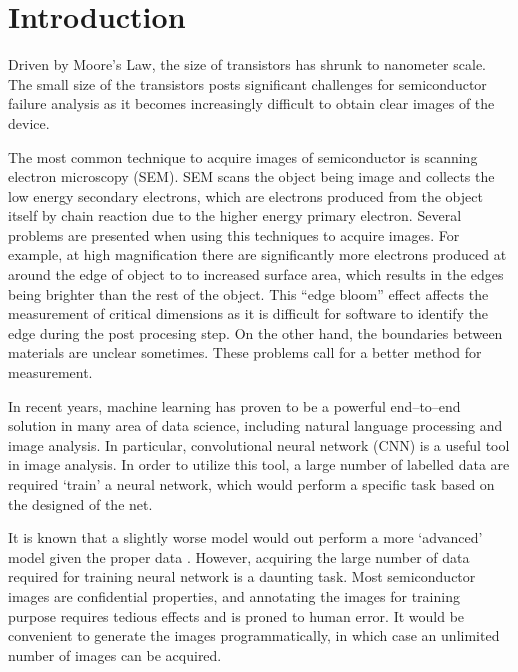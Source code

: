 \chapter{Introduction}
\pagestyle{fancy}
\fancyhead{}
\fancyhead[R]{\thepage}
\fancyfoot{}
\renewcommand{\headrulewidth}{0pt}
\renewcommand{\footrulewidth}{0pt}

\setcounter{page}{1}
Driven by Moore's Law, the size of transistors has shrunk to nanometer scale. The small size of the transistors posts significant challenges for semiconductor failure analysis as it becomes increasingly difficult to obtain clear images of the device.

The most common technique to acquire images of semiconductor is scanning electron microscopy (SEM). SEM scans the object being image and collects the low energy secondary electrons, which are electrons produced from the object itself by chain reaction due to the higher energy primary electron. Several problems are presented when using this techniques to acquire images. For example, at high magnification there are significantly more electrons produced at around the edge of object to to increased surface area, which results in the edges being brighter than the rest of the object. This ``edge bloom'' effect affects the measurement of critical dimensions as it is difficult for software to identify the edge during the post procesing step. On the other hand, the boundaries between materials are unclear sometimes. These problems call for a better method for measurement.

In recent years, machine learning has proven to be a powerful end--to--end solution in many area of data science, including natural language processing and image analysis. In particular, convolutional neural network (CNN) is a useful tool in image analysis. In order to utilize this tool, a large number of labelled data are required `train' a neural network, which would perform a specific task based on the designed of the net.

It is known that a slightly worse model would out perform a more `advanced' model given the proper data \cite{halevy2009unreasonable}. However, acquiring the large number of data required for training neural network is a daunting task. Most semiconductor images are confidential properties, and annotating the images for training purpose requires tedious effects and is proned to human error. It would be convenient to generate the images programmatically, in which case an unlimited number of images can be acquired. 

